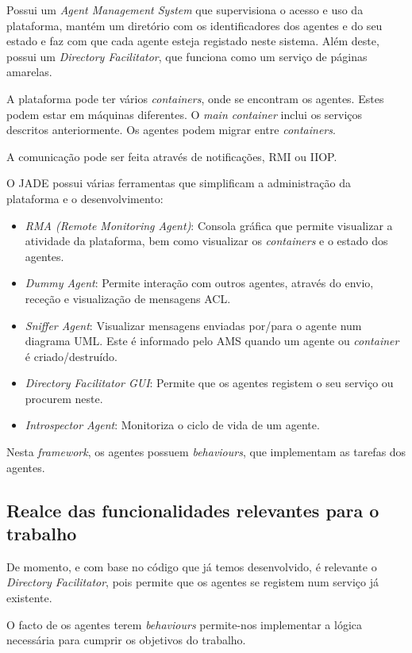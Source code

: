 \documentclass[a4paper]{article}
\begin{document}
Possui um \textit{Agent Management System} que supervisiona o acesso e uso da plataforma, mantém um diretório com os identificadores dos agentes e do seu estado e faz com que cada agente esteja registado neste sistema. Além deste, possui um \textit{Directory Facilitator}, que funciona como um serviço de páginas amarelas.

A plataforma pode ter vários \textit{containers}, onde se encontram os agentes. Estes podem estar em máquinas diferentes. O \textit{main container} inclui os serviços descritos anteriormente. Os agentes podem migrar entre \textit{containers}.

A comunicação pode ser feita através de notificações, RMI ou IIOP. 

O JADE possui várias ferramentas que simplificam a administração da plataforma e o desenvolvimento:

\begin{itemize}
\item \textit{RMA (Remote Monitoring Agent)}: Consola gráfica que permite visualizar a atividade da plataforma, bem como visualizar os \textit{containers} e o estado dos agentes.
\item \textit{Dummy Agent}: Permite interação com outros agentes, através do envio, receção e visualização de mensagens ACL.
\item \textit{Sniffer Agent}: Visualizar mensagens enviadas por/para o agente num diagrama UML. Este é informado pelo AMS quando um agente ou \textit{container} é criado/destruído.
\item \textit{Directory Facilitator GUI}: Permite que os agentes registem o seu serviço ou procurem neste.
\item \textit{Introspector Agent}: Monitoriza o ciclo de vida de um agente.
\end{itemize}

Nesta \textit{framework}, os agentes possuem \textit{behaviours}, que implementam as tarefas dos agentes.

\subsection{Realce das funcionalidades relevantes para o trabalho} 

De momento, e com base no código que já temos desenvolvido, é relevante o \textit{Directory Facilitator}, pois permite que os agentes se registem num serviço já existente.

O facto de os agentes terem \textit{behaviours} permite-nos implementar a lógica necessária para cumprir os objetivos do trabalho.
\end{document}
